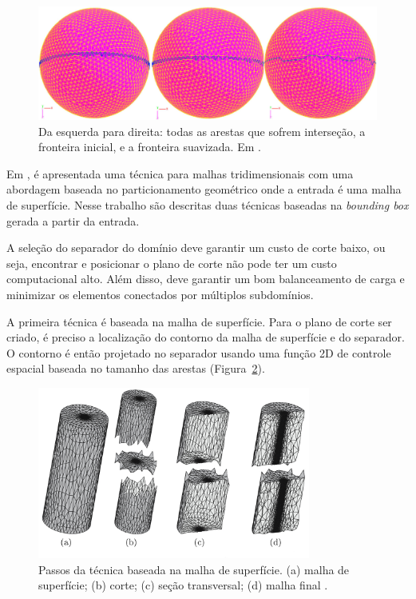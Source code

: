  \begin{figure}[htbp]
     \centering
     \includegraphics[width=1.0\textwidth]{fig/chen.png}
     \caption{Da esquerda para direita: todas as arestas que sofrem interseção, a fronteira inicial, e a fronteira suavizada. Em \cite{bib:CHEN12}.}
     \label{fig:chen}
 \end{figure}
 
 
 Em \cite{bib:Glut08}, é apresentada uma técnica para malhas tridimensionais com uma abordagem baseada no particionamento geométrico onde a entrada é uma malha de superfície. Nesse trabalho são descritas duas técnicas baseadas na \textit{bounding box} gerada a partir da entrada.
 
 A seleção do separador do domínio deve garantir um custo de corte baixo, ou seja, encontrar e posicionar o plano de corte não pode ter um custo computacional alto. Além disso, deve garantir um bom balanceamento de carga e minimizar os elementos conectados por múltiplos subdomínios.
 
 A primeira técnica é baseada na malha de superfície. Para o plano de corte ser criado, é preciso a localização do contorno da malha de superfície e do separador. O contorno é então projetado no separador usando uma função 2D de controle espacial baseada no tamanho das arestas (Figura~\ref{fig:glut08_1}).
 
 \begin{figure}[htbp]
 	\centering
 	\includegraphics[width=0.8\textwidth]{fig/glut08_1.jpg}
 	\caption{Passos da técnica baseada na malha de superfície. (a) malha de superfície; (b) corte; (c) seção transversal; (d) malha final \cite{bib:Glut08}.}
 	\label{fig:glut08_1}
 \end{figure}
 
